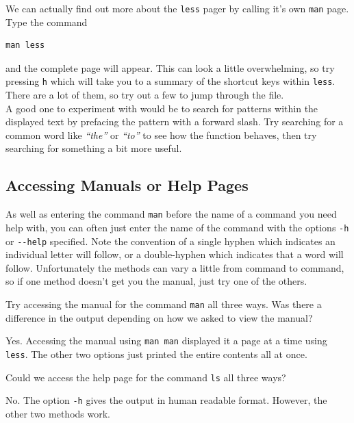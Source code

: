 \documentclass[a4paper,12pt,twoside]{memoir}
\begin{document}
\begin{bonus}
We can actually find out more about the \texttt{less} pager by calling it's own \texttt{man} page.
Type the command \\
\begin{lstlisting}
man less
\end{lstlisting}
 and the complete page will appear.
This can look a little overwhelming, so try pressing \texttt{h} which will take you to a summary of the shortcut keys within \texttt{less}.
There are a lot of them, so try out a few to jump through the file. \\

A good one to experiment with would be to search for patterns within the displayed text by prefacing the pattern with a forward slash.
Try searching for a common word like \textit{``the''} or \textit{``to''} to see how the function behaves, then try searching for something a bit more useful. \\
\end{bonus}

\subsection{Accessing Manuals or Help Pages}
\begin{information}
As well as entering the command \texttt{man} before the name of a command you need help with, you can often just enter the name of the command with the options \texttt{-h} or \texttt{-{}-help} specified.
Note the convention of a single hyphen which indicates an individual letter will follow, or a double-hyphen which indicates that a word will follow.
Unfortunately the methods can vary a little from command to command, so if one method doesn't get you the manual, just try one of the others. \\
\end{information}

\begin{questions}
Try accessing the manual for the command \texttt{man} all three ways. 
Was there a difference in the output depending on how we asked to view the manual?\\
\begin{answer}
Yes.
Accessing the manual using \texttt{man man} displayed it a page at a time using \texttt{less}.
The other two options just printed the entire contents all at once.\\
\end{answer}


Could we access the help page for the command \texttt{ls} all three ways? \\
\begin{answer}
No.
The option \texttt{-h} gives the output in human readable format.
However, the other two methods work.\\
\end{answer}
\end{questions}
\end{document}
